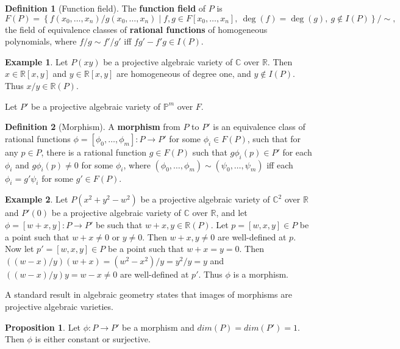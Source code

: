 \documentclass{article}
\newcommand{\R}{\mathbb{R}}
\newcommand{\C}{\mathbb{C}}
\renewcommand{\P}{\mathbb{P}}
\newcommand{\rb}[1]{\left( #1 \right)}
\renewcommand{\sb}[1]{\left[ #1 \right]}
\newcommand{\cb}[1]{\left\{ #1 \right\}}
\theoremstyle{definition}\newtheorem*{definition}{Definition}
\theoremstyle{definition}\newtheorem*{example}{Example}
\theoremstyle{definition}\newtheorem*{remark}{Remark}
\newtheorem{proposition}{Proposition}[subsection]
\begin{document}
\begin{definition}[Function field]
The \textbf{function field} of $ P $ is
$$ F\rb{P} = \cb{f\rb{x_0, \dots, x_n} / g\rb{x_0, \dots, x_n} \mid f, g \in F\sb{x_0, \dots, x_n}, \ \deg\rb{f} = \deg\rb{g}, \ g \notin I\rb{P}} / \sim, $$
the field of equivalence classes of \textbf{rational functions} of homogeneous polynomials, where $ f / g \sim f' / g' $ iff $ fg' - f'g \in I\rb{P} $.
\end{definition}

\begin{example}
Let $ P\rb{xy} $ be a projective algebraic variety of $ \C $ over $ \R $. Then $ x \in \R\sb{x, y} $ and $ y \in \R\sb{x, y} $ are homogeneous of degree one, and $ y \notin I\rb{P} $. Thus $ x / y \in \R\rb{P} $.
\end{example}

Let $ P' $ be a projective algebraic variety of $ \P^m $ over $ F $.

\begin{definition}[Morphism]
A \textbf{morphism} from $ P $ to $ P' $ is an equivalence class of rational functions $ \phi = \sb{\phi_0, \dots, \phi_m} : P \to P' $ for some $ \phi_i \in F\rb{P} $, such that for any $ p \in P $, there is a rational function $ g \in F\rb{P} $ such that $ g\phi_i\rb{p} \in P' $ for each $ \phi_i $ and $ g\phi_i\rb{p} \ne 0 $ for some $ \phi_i $, where $ \rb{\phi_0, \dots, \phi_m} \sim \rb{\psi_0, \dots, \psi_m} $ iff each $ \phi_i = g'\psi_i $ for some $ g' \in F\rb{P} $.
\end{definition}

\begin{example}
Let $ P\rb{x^2 + y^2 - w^2} $ be a projective algebraic variety of $ \C^2 $ over $ \R $ and $ P'\rb{0} $ be a projective algebraic variety of $ \C $ over $ \R $, and let $ \phi = \sb{w + x, y} : P \to P' $ be such that $ w + x, y \in \R\rb{P} $. Let $ p = \sb{w, x, y} \in P $ be a point such that $ w + x \ne 0 $ or $ y \ne 0 $. Then $ w + x, y \ne 0 $ are well-defined at $ p $. Now let $ p' = \sb{w, x, y} \in P $ be a point such that $ w + x = y = 0 $. Then $ \rb{\rb{w - x} / y}\rb{w + x} = \rb{w^2 - x^2} / y = y^2 / y = y $ and $ \rb{\rb{w - x} / y}y = w - x \ne 0 $ are well-defined at $ p' $. Thus $ \phi $ is a morphism.
\end{example}

A standard result in algebraic geometry states that images of morphisms are projective algebraic varieties.

\begin{proposition}
Let $ \phi : P \to P' $ be a morphism and $ dim\rb{P} = dim\rb{P'} = 1 $. Then $ \phi $ is either constant or surjective.
\end{proposition}
\end{document}
